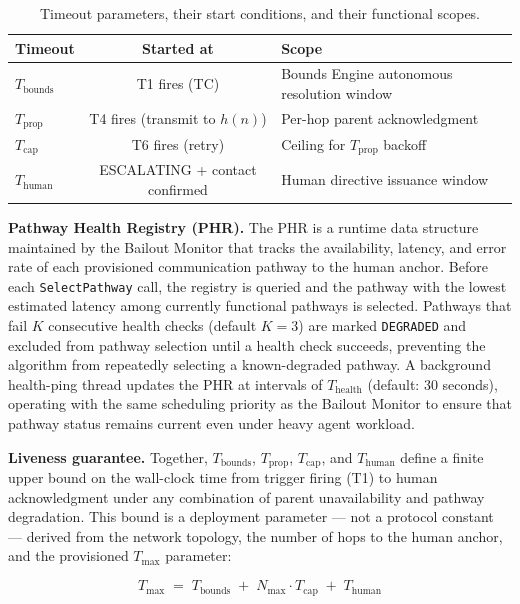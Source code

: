 \begin{table}[htbp]
\centering
\caption{Timeout parameters, their start conditions, and their functional scopes.}
\label{tab:timeouts}
\begin{tabular}{lcl}
\hline
\textbf{Timeout} & \textbf{Started at} & \textbf{Scope} \\ \hline
$T_{\text{bounds}}$ & T1 fires (TC) & Bounds Engine autonomous resolution window \\
$T_{\text{prop}}$ & T4 fires (transmit to $h(n)$) & Per-hop parent acknowledgment \\
$T_{\text{cap}}$ & T6 fires (retry) & Ceiling for $T_{\text{prop}}$ backoff \\
$T_{\text{human}}$ & ESCALATING + contact confirmed & Human directive issuance window \\
\hline
\end{tabular}
\end{table}

\medskip\noindent\textbf{Pathway Health Registry (PHR).} The PHR is a runtime data structure maintained by the Bailout Monitor that tracks the availability, latency, and error rate of each provisioned communication pathway to the human anchor. Before each \texttt{SelectPathway} call, the registry is queried and the pathway with the lowest estimated latency among currently functional pathways is selected. Pathways that fail $K$ consecutive health checks (default $K = 3$) are marked \texttt{DEGRADED} and excluded from pathway selection until a health check succeeds, preventing the algorithm from repeatedly selecting a known-degraded pathway. A background health-ping thread updates the PHR at intervals of $T_{\text{health}}$ (default: 30 seconds), operating with the same scheduling priority as the Bailout Monitor to ensure that pathway status remains current even under heavy agent workload.

\medskip\noindent\textbf{Liveness guarantee.} Together, $T_{\text{bounds}}$, $T_{\text{prop}}$, $T_{\text{cap}}$, and $T_{\text{human}}$ define a finite upper bound on the wall-clock time from trigger firing (T1) to human acknowledgment under any combination of parent unavailability and pathway degradation. This bound is a deployment parameter — not a protocol constant — derived from the network topology, the number of hops to the human anchor, and the provisioned $T_{\max}$ parameter:

\begin{equation}
T_{\max} \;=\; T_{\text{bounds}} \;+\; N_{\max} \cdot T_{\text{cap}} \;+\; T_{\text{human}} \tag{T-max}
\end{equation}

